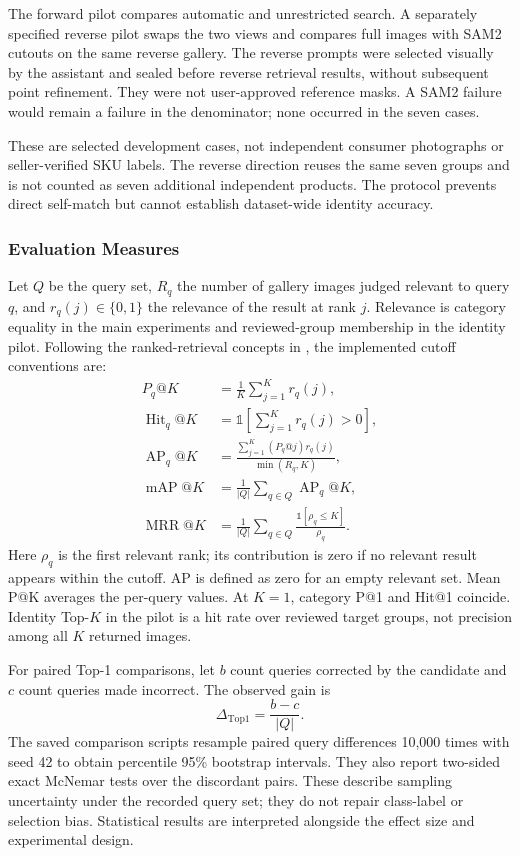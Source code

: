 The forward pilot compares automatic and unrestricted search. A separately
specified reverse pilot swaps the two views and compares full images with SAM2
cutouts on the same reverse gallery. The reverse prompts were selected visually
by the assistant and sealed before reverse retrieval results, without subsequent
point refinement. They were not user-approved reference masks. A SAM2 failure
would remain a failure in the denominator; none occurred in the seven cases.

These are selected development cases, not independent consumer photographs or
seller-verified SKU labels. The reverse direction reuses the same seven groups
and is not counted as seven additional independent products. The protocol
prevents direct self-match but cannot establish dataset-wide identity accuracy.

\subsubsection{Evaluation Measures}
Let $Q$ be the query set, $R_q$ the number of gallery images judged relevant to
query $q$, and $r_q(j)\in\{0,1\}$ the relevance of the result at rank $j$.
Relevance is category equality in the main experiments and reviewed-group
membership in the identity pilot. Following the ranked-retrieval concepts in
\cite{Manning2008IR}, the implemented cutoff conventions are:
\begin{align}
 P_q@K &= \frac{1}{K}\sum_{j=1}^{K} r_q(j), \\
 \operatorname{Hit}_q@K &= \mathbb{1}\!\left[\sum_{j=1}^{K}r_q(j)>0\right], \\
 \operatorname{AP}_q@K &= \frac{\sum_{j=1}^{K}(P_q@j)r_q(j)}{\min(R_q,K)}, \\
 \operatorname{mAP}@K &= \frac{1}{|Q|}\sum_{q\in Q}\operatorname{AP}_q@K, \\
 \operatorname{MRR}@K &= \frac{1}{|Q|}\sum_{q\in Q}\frac{\mathbb{1}[\rho_q\leq K]}{\rho_q}.
\end{align}
Here $\rho_q$ is the first relevant rank; its contribution is zero if no relevant
result appears within the cutoff. AP is defined as zero for an empty relevant
set. Mean P@K averages the per-query values. At $K=1$, category P@1 and Hit@1
coincide. Identity Top-$K$ in the pilot is a hit rate over reviewed target groups,
not precision among all $K$ returned images.

For paired Top-1 comparisons, let $b$ count queries corrected by the candidate
and $c$ count queries made incorrect. The observed gain is
\begin{equation}
 \Delta_{\mathrm{Top1}}=\frac{b-c}{|Q|}.
\end{equation}
The saved comparison scripts resample paired query differences 10,000 times
with seed 42 to obtain percentile 95\% bootstrap intervals. They also report
two-sided exact McNemar tests over the discordant pairs. These describe sampling
uncertainty under the recorded query set; they do not repair class-label or
selection bias. Statistical results are interpreted alongside the effect size
and experimental design.


